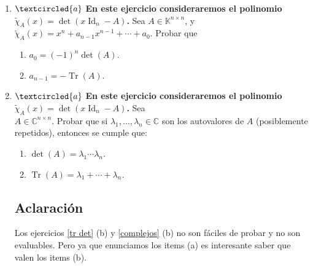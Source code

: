 \begin{enumerate}[resume,topsep=6pt,itemsep=.4cm]
\item\label{tr det}$\textcircled{a}$ {\bf En este ejercicio consideraremos el polinomio $\tilde\chi_A(x)=\det(x\operatorname{Id}_n-A)$.}
Sea $A\in\mathbb{K}^{n\times n}$, y \ $\tilde\chi_A(x) = x^n+a_{n-1}x^{n-1}+\cdots+a_0$. Probar que


\begin{enumerate}
    \item $a_0 = (-1)^n \det(A)$.
    \item $a_{n-1} = - \operatorname{Tr}(A)$.
\end{enumerate}


\item\label{complejos} $\textcircled{a}$ {\bf En este ejercicio consideraremos el polinomio $\tilde\chi_A(x)=\det(x\operatorname{Id}_n-A)$.} Sea \\ $A\in\mathbb{C}^{n\times n}$. Probar que si $\lambda_1,\dots,\lambda_n \in \mathbb C$ son los autovalores de $A$
(posiblemente repetidos), entonces se cumple que:


\begin{enumerate}
    \item $\det(A)=\lambda_1\cdots \lambda_n$.
    \item $\operatorname{Tr}(A)=\lambda_1+\cdots+\lambda_n$.
\end{enumerate}

\subsection*{Aclaración}
Los ejercicios \ref{tr det} (b) y \ref{complejos} (b) no son fáciles de probar y no son evaluables. Pero ya que enunciamos los items (a) es interesante saber que valen los items (b).
%
%

\end{enumerate}


